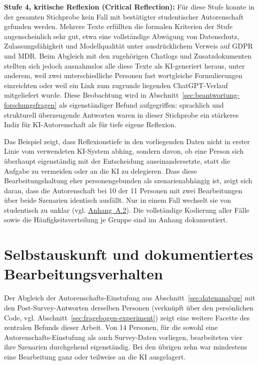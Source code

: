 \textbf{Stufe 4, kritische Reflexion (Critical Reflection):} Für diese Stufe konnte in der gesamten Stichprobe kein Fall mit
bestätigter studentischer Autorenschaft gefunden werden. Mehrere Texte erfüllten die formalen
Kriterien der Stufe augenscheinlich sehr gut, etwa eine vollständige Abwägung von Datenschutz,
Zulassungsfähigkeit und Modellqualität unter ausdrücklichem Verweis auf GDPR und MDR. Beim Abgleich
mit den zugehörigen Chatlogs und Zusatzdokumenten stellten sich jedoch ausnahmslos alle diese Texte
als KI-generiert heraus, unter anderem, weil zwei unterschiedliche Personen fast wortgleiche
Formulierungen einreichten oder weil ein Link zum zugrunde liegenden ChatGPT-Verlauf mitgeliefert
wurde. Diese Beobachtung wird in Abschnitt~\ref{sec:beantwortung-forschungsfragen} als eigenständiger
Befund aufgegriffen: sprachlich und strukturell überzeugende Antworten waren in dieser Stichprobe ein
stärkeres Indiz für KI-Autorenschaft als für tiefe eigene Reflexion.

Das Beispiel zeigt, dass Reflexionstiefe in den vorliegenden Daten nicht in erster Linie vom
verwendeten KI-System abhing, sondern davon, ob eine Person sich überhaupt eigenständig mit der
Entscheidung auseinandersetzte, statt die Aufgabe zu vermeiden oder an die KI zu delegieren. Dass diese Bearbeitungshaltung eher
personengebunden als szenarienabhängig ist, zeigt sich daran, dass die Autorenschaft bei 10 der 11
Personen mit zwei Bearbeitungen über beide Szenarien identisch ausfällt. Nur in einem Fall wechselt
sie von \glqq studentisch\grqq{} zu \glqq unklar\grqq{} (vgl. \hyperref[app:kodierungstabelle]{Anhang~A.2}). Die
vollständige Kodierung aller Fälle sowie die Häufigkeitsverteilung je Gruppe sind im Anhang
dokumentiert.

\section{Selbstauskunft und dokumentiertes Bearbeitungsverhalten}
\label{sec:selbstauskunft-verhalten}

Der Abgleich der Autorenschafts-Einstufung aus Abschnitt~\ref{sec:datenanalyse} mit den
Post-Survey-Antworten derselben Personen (verknüpft über den persönlichen Code, vgl.
Abschnitt~\ref{sec:fragebogen-experiment}) zeigt eine weitere Facette des zentralen Befunds dieser
Arbeit. Von 14 Personen, für die sowohl eine Autorenschafts-Einstufung als auch Survey-Daten vorliegen,
bearbeiteten vier ihre Szenarien durchgehend eigenständig. Bei den übrigen zehn war mindestens eine
Bearbeitung ganz oder teilweise an die KI ausgelagert.

